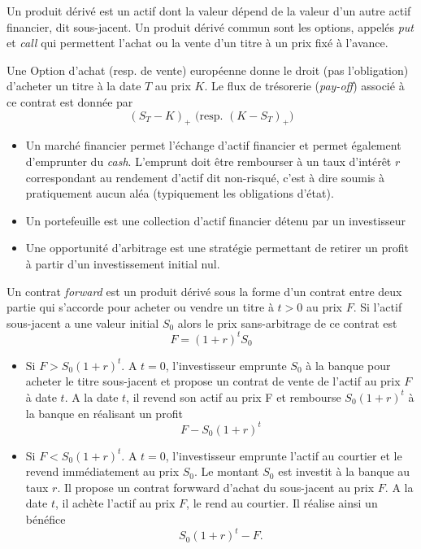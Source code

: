 \noindent Un produit dérivé est un actif dont la valeur dépend de la valeur d'un autre actif financier, dit sous-jacent. Un produit dérivé commun sont les options, appelés \textit{put} et \textit{call} qui permettent l'achat ou la vente d'un titre à un prix fixé à l'avance. 
\begin{definition}\label{def:eu_option}
Une Option d'achat (resp. de vente) européenne donne le droit (pas l'obligation) d'acheter un titre à la date $T$ au prix $K$. Le flux de trésorerie (\textit{pay-off}) associé à ce contrat est donnée par 
$$
(S_T-K)_{+}\text{ (resp. }(K-S_T)_{+})
$$ 
\end{definition}
\begin{itemize}
\item Un marché financier permet l'échange d'actif financier et permet également d'emprunter du \textit{cash}. L'emprunt doit être rembourser à un taux d'intérêt $r$ correspondant au rendement d'actif dit non-risqué, c'est à dire soumis à pratiquement aucun aléa (typiquement les obligations d'état).
\item Un portefeuille est une collection d'actif financier détenu par un investisseur
\item Une opportunité d'arbitrage est une stratégie permettant de retirer un profit à partir d'un investissement initial nul. 
\end{itemize}
\begin{ex}
Un contrat \textit{forward} est un produit dérivé sous la forme d'un contrat entre deux partie qui s'accorde pour acheter ou vendre un titre à $t>0$ au prix $F$. Si l'actif sous-jacent a une valeur initial $S_0$ alors le prix sans-arbitrage de ce contrat est 
$$
F = (1+r)^t S_0
$$
\begin{itemize}
    \item Si $F > S_0(1+r)^t$. A $t = 0$, l'investisseur emprunte $S_0$ à la banque pour acheter le titre sous-jacent et propose un contrat de vente de l'actif au prix $F$ à date $t$. A la date $t$, il revend son actif au prix F et rembourse $S_0(1+r)^t$ à la banque en réalisant un profit 
    $$
    F-S_0(1+r)^t
    $$ 
    \item Si $F < S_0(1+r)^t$. A $t = 0$, l'investisseur emprunte l'actif au courtier et le revend immédiatement au prix $S_0$. Le montant $S_0$ est investit à la banque au taux $r$. Il propose un contrat forwward d'achat du sous-jacent au prix $
    F$. A la date $t$, il achète l'actif au prix $F$, le rend au courtier. Il réalise ainsi un bénéfice 
    $$
    S_0(1+r)^t-F.
    $$
\end{itemize}
\end{ex}

